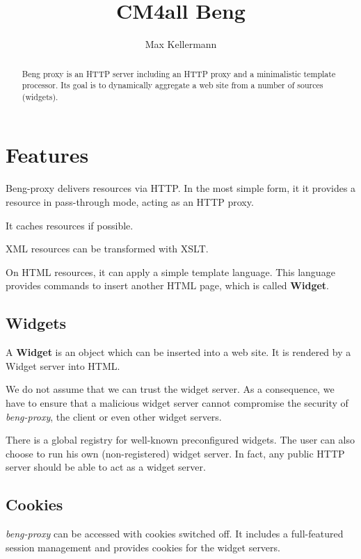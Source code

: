 \documentclass[a4paper,12pt]{article}
\begin{document}
\title{CM4all Beng}
\author{Max Kellermann}

\maketitle

\begin{abstract}
Beng proxy is an HTTP server including an HTTP proxy and a
minimalistic template processor.  Its goal is to dynamically aggregate
a web site from a number of sources (widgets).
\end{abstract}


\section{Features}

Beng-proxy delivers resources via HTTP.  In the most simple form, it
it provides a resource in pass-through mode, acting as an HTTP proxy.

It caches resources if possible.

XML resources can be transformed with XSLT.

On HTML resources, it can apply a simple template language.  This
language provides commands to insert another HTML page, which is
called \textbf{Widget}.

\subsection{Widgets}

A \textbf{Widget} is an object which can be inserted into a web site.
It is rendered by a Widget server into HTML.

We do not assume that we can trust the widget server.  As a
consequence, we have to ensure that a malicious widget server cannot
compromise the security of \emph{beng-proxy}, the client or even other
widget servers.

There is a global registry for well-known preconfigured widgets.  The
user can also choose to run his own (non-registered) widget server.
In fact, any public HTTP server should be able to act as a widget
server.


\subsection{Cookies}

\emph{beng-proxy} can be accessed with cookies switched off.  It includes a
full-featured session management and provides cookies for the widget
servers.
\end{document}
